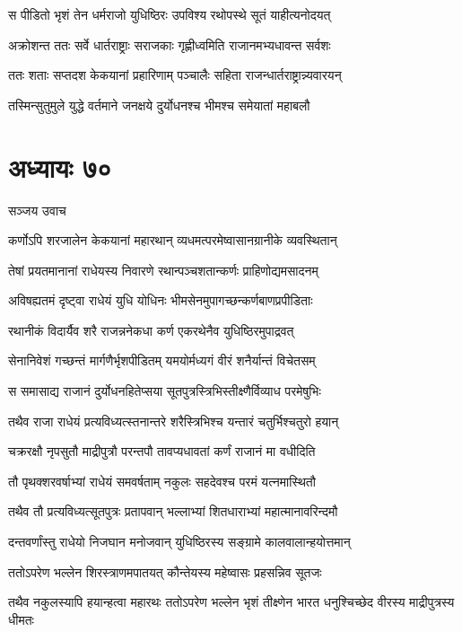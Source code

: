 \twolineshloka
{स पीडितो भृशं तेन धर्मराजो युधिष्ठिरः}
{उपविश्य रथोपस्थे सूतं याहीत्यनोदयत्}


\twolineshloka
{अक्रोशन्त ततः सर्वे धार्तराष्ट्राः सराजकाः}
{गृह्णीध्वमिति राजानमभ्यधावन्त सर्वशः}


\twolineshloka
{ततः शताः सप्तदश केकयानां प्रहारिणाम्}
{पञ्चालैः सहिता राजन्धार्तराष्ट्रान्न्यवारयन्}


\twolineshloka
{तस्मिन्सुतुमुले युद्धे वर्तमाने जनक्षये}
{दुर्योधनश्च भीमश्च समेयातां महाबलौ}


\chapter{अध्यायः ७०}
\twolineshloka
{सञ्जय उवाच}
{}


\twolineshloka
{कर्णोऽपि शरजालेन केकयानां महारथान्}
{व्यधमत्परमेष्वासानग्रानीके व्यवस्थितान्}


\twolineshloka
{तेषां प्रयतमानानां राधेयस्य निवारणे}
{रथान्पञ्चशतान्कर्णः प्राहिणोद्यमसादनम्}


\twolineshloka
{अविषह्यतमं दृष्ट्वा राधेयं युधि योधिनः}
{भीमसेनमुपागच्छन्कर्णबाणप्रपीडिताः}


\twolineshloka
{रथानीकं विदार्यैव शरै राजन्ननेकधा}
{कर्ण एकरथेनैव युधिष्ठिरमुपाद्रवत्}


\twolineshloka
{सेनानिवेशं गच्छन्तं मार्गणैर्भृशपीडितम्}
{यमयोर्मध्यगं वीरं शनैर्यान्तं विचेतसम्}


\twolineshloka
{स समासाद्य राजानं दुर्योधनहितेप्सया}
{सूतपुत्रस्त्रिभिस्तीक्ष्णैर्विव्याध परमेषुभिः}


\twolineshloka
{तथैव राजा राधेयं प्रत्यविध्यत्स्तनान्तरे}
{शरैस्त्रिभिश्च यन्तारं चतुर्भिश्चतुरो हयान्}


\twolineshloka
{चक्ररक्षौ नृपसुतौ माद्रीपुत्रौ परन्तपौ}
{तावप्यधावतां कर्णं राजानं मा वधीदिति}


\twolineshloka
{तौ पृथक्शरवर्षाभ्यां राधेयं समवर्षताम्}
{नकुलः सहदेवश्च परमं यत्नमास्थितौ}


\twolineshloka
{तथैव तौ प्रत्यविध्यत्सूतपुत्रः प्रतापवान्}
{भल्लाभ्यां शितधाराभ्यां महात्मानावरिन्दमौ}


\twolineshloka
{दन्तवर्णांस्तु राधेयो निजघान मनोजवान्}
{युधिष्ठिरस्य सङ्ग्रामे कालवालान्हयोत्तमान्}


\twolineshloka
{ततोऽपरेण भल्लेन शिरस्त्राणमपातयत्}
{कौन्तेयस्य महेष्वासः प्रहसन्निव सूतजः}


\threelineshloka
{तथैव नकुलस्यापि हयान्हत्वा महारथः}
{ततोऽपरेण भल्लेन भृशं तीक्ष्णेन भारत}
{धनुश्चिच्छेद वीरस्य माद्रीपुत्रस्य धीमतः}


